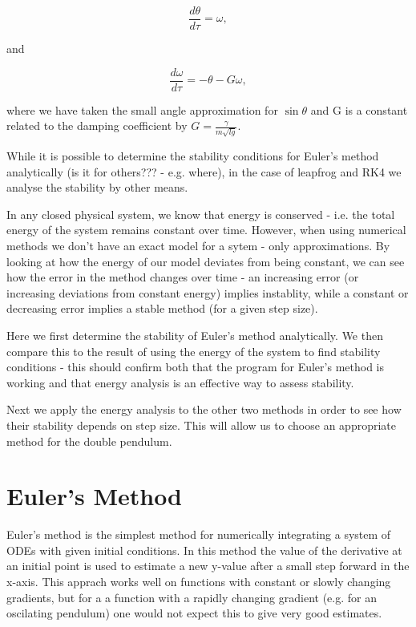 \documentclass[a4paper,11pt,twoside]{article}
\begin{document}
\begin{equation}
	\label{dtheta}
	\frac{d \theta}{d \tau} = \omega,
\end{equation}

and

\begin{equation}
	\label{domega}
	\frac{d \omega}{d \tau} = -\theta - G\omega,
\end{equation}

where we have taken the small angle approximation for \(\sin\theta\) 
and G is a constant related to the damping coefficient by
\(G = \frac{\gamma}{m\sqrt{lg}}\).

While it is possible to determine the stability conditions for Euler's
method analytically (is it for others??? - e.g. where), in the case of leapfrog and RK4 
we analyse the stability by other means.

In any closed physical system, we know that energy is 
conserved - i.e. the total energy of the system remains 
constant over time. However, when using numerical methods we don't have 
an exact model for a sytem - only approximations. By looking at 
how the energy of our model deviates from being constant, we can see 
how the error in the method changes over time - an increasing error 
(or increasing deviations from constant energy) implies instablity, while a constant 
or decreasing error implies a stable method (for a given step size).

Here we first determine the stability of Euler's method analytically. 
We then compare this to the result of using the energy of the system 
to find stability conditions - this should confirm both that the program 
for Euler's method is working and that energy analysis is an effective 
way to assess stability.

Next we apply the energy analysis to the other two methods in order to 
see how their stability depends on step size. This will allow us to choose 
an appropriate method for the double pendulum.

\section{Euler's Method}
Euler's method is the simplest method for numerically integrating a 
system of ODEs with given initial conditions. In this method the value 
of the derivative at an initial point is used to estimate a new y-value 
after a small step forward in the x-axis. This apprach works well on
functions with constant or slowly changing gradients, but for a 
a function with a rapidly changing gradient (e.g. for an oscilating 
pendulum) one would not expect this to give very good estimates.
\end{document}
